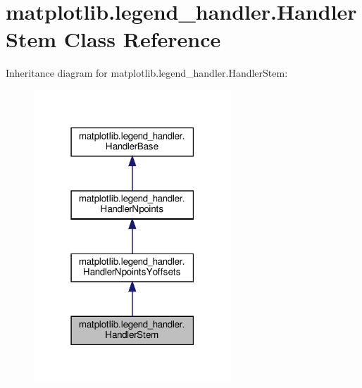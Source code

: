 \hypertarget{classmatplotlib_1_1legend__handler_1_1HandlerStem}{}\section{matplotlib.\+legend\+\_\+handler.\+Handler\+Stem Class Reference}
\label{classmatplotlib_1_1legend__handler_1_1HandlerStem}


Inheritance diagram for matplotlib.\+legend\+\_\+handler.\+Handler\+Stem\+:
\nopagebreak
\begin{figure}[H]
\begin{center}
\leavevmode
\includegraphics[width=210pt]{classmatplotlib_1_1legend__handler_1_1HandlerStem__inherit__graph}
\end{center}
\end{figure}


